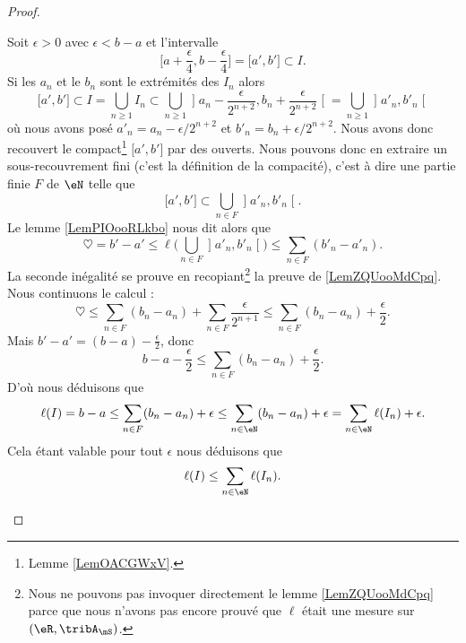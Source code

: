 \begin{proof}
\begin{subproof}
            Soit \( \epsilon>0\) avec \( \epsilon<b-a\) et l'intervalle
            \begin{equation}
                \mathopen[ a+\frac{ \epsilon }{ 4 } , b-\frac{ \epsilon }{ 4 } \mathclose]=\mathopen[ a' , b' \mathclose]\subset I.
            \end{equation}
            Si les \( a_n\) et le \( b_n\) sont le extrémités des \( I_n\) alors
            \begin{equation}
                \mathopen[ a' , b' \mathclose]\subset I=\bigcup_{n\geq 1}I_n\subset\bigcup_{n\geq 1}\mathopen] a_n-\frac{ \epsilon }{ 2^{n+2} } , b_n+\frac{ \epsilon }{ 2^{n+2} } \mathclose[=\bigcup_{n\geq 1}\mathopen] a'_n , b'_n \mathclose[
            \end{equation}
            où nous avons posé \( a'_n=a_n-\epsilon/2^{n+2}\) et \( b'_n=b_n+\epsilon/2^{n+2}\). Nous avons donc recouvert le compact\footnote{Lemme \ref{LemOACGWxV}.} \( \mathopen[ a' , b' \mathclose]\) par des ouverts. Nous pouvons donc en extraire un sous-recouvrement fini (c'est la définition de la compacité), c'est à dire une partie finie \( F\) de \( \eN\) telle que 
            \begin{equation}
                \mathopen[ a' , b' \mathclose]\subset \bigcup_{n\in F}\mathopen] a'_n , b'_n \mathclose[.
            \end{equation}
            Le lemme \ref{LemPIOooRLkbo} nous dit alors que
            \begin{equation}
                \heartsuit=b'-a'\leq \ell\big( \bigcup_{n\in F}\mathopen] a'_n , b'_n \mathclose[ \big)\leq \sum_{n\in F}(b'_n-a'_n).
            \end{equation}
            La seconde inégalité se prouve en recopiant\footnote{Nous ne pouvons pas invoquer directement le lemme \ref{LemZQUooMdCpq} parce que nous n'avons pas encore prouvé que \( \ell\) était une mesure sur \( (\eR,\tribA_{\mS})\).} la preuve de \ref{LemZQUooMdCpq}. Nous continuons le calcul :
            \begin{equation}
                \heartsuit\leq\sum_{n\in F}(b_n-a_n)+\sum_{n\in F}\frac{ \epsilon }{ 2^{n+1} }\leq \sum_{n\in F}(b_n-a_n)+\frac{ \epsilon }{2}.
            \end{equation}
            Mais \( b'-a'=(b-a)-\frac{ \epsilon }{2}\), donc
            \begin{equation}
                b-a-\frac{ \epsilon }{2}\leq \sum_{n\in F}(b_n-a_n)+\frac{ \epsilon }{2}.
            \end{equation}
            D'où nous déduisons que
            \begin{equation}
                \ell(I)=b-a\leq \sum_{n\in F}(b_n-a_n)+\epsilon\leq \sum_{n\in \eN}(b_n-a_n)+\epsilon=\sum_{n\in \eN}\ell(I_n)+\epsilon.
            \end{equation}
            Cela étant valable pour tout \( \epsilon\) nous déduisons que
            \begin{equation}
                \ell(I)\leq\sum_{n\in \eN}\ell(I_n).
            \end{equation}


\end{subproof}
\end{proof}
